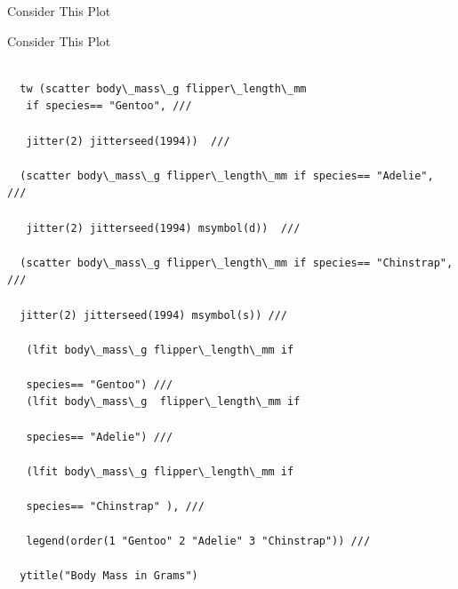 \documentclass[shownotes,12pt, aspectratio=169]{beamer}
\begin{document}
\begin{frame}[t]{Consider This Plot}
  \begin{center}
\end{center}
\end{frame}

\transreplace

\begin{frame}[t]{Consider This Plot}
\begin{verbatim}

  tw (scatter body\_mass\_g flipper\_length\_mm
   if species== "Gentoo", ///

   jitter(2) jitterseed(1994))  ///

  (scatter body\_mass\_g flipper\_length\_mm if species== "Adelie", ///

   jitter(2) jitterseed(1994) msymbol(d))  ///

  (scatter body\_mass\_g flipper\_length\_mm if species== "Chinstrap", ///

  jitter(2) jitterseed(1994) msymbol(s)) ///

   (lfit body\_mass\_g flipper\_length\_mm if

   species== "Gentoo") ///
   (lfit body\_mass\_g  flipper\_length\_mm if

   species== "Adelie") ///

   (lfit body\_mass\_g flipper\_length\_mm if

   species== "Chinstrap" ), ///

   legend(order(1 "Gentoo" 2 "Adelie" 3 "Chinstrap")) ///

  ytitle("Body Mass in Grams")
\end{verbatim}
\end{frame}
\end{document}
